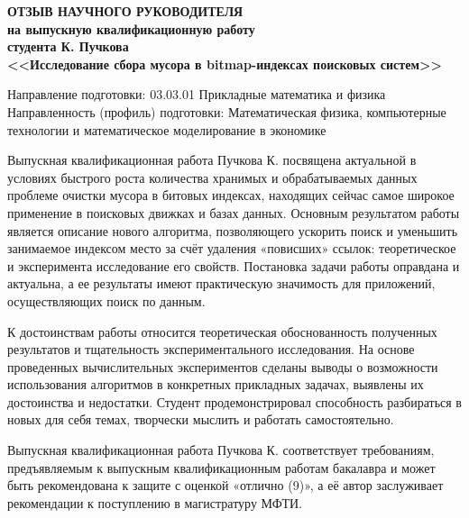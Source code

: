 \documentclass[a4paper,oneside,final,12pt,russian]{extarticle}
\begin{document}
\begin{center}
\textbf{ОТЗЫВ НАУЧНОГО РУКОВОДИТЕЛЯ}\\
\textbf{на выпускную квалификационную работу}\\
\textbf{студента К. Пучкова}\\
\textbf{<<Исследование сбора мусора в bitmap-индексах поисковых систем>>}\\
\end{center}

\onehalfspacing

\begin{flushleft}
Направление подготовки: 03.03.01 Прикладные математика и физика\\
Направленность (профиль) подготовки: Математическая физика,
компьютерные технологии и математическое моделирование в экономике\\
\end{flushleft}

Выпускная квалификационная работа Пучкова К. посвящена актуальной в условиях
быстрого роста количества хранимых и обрабатываемых данных проблеме очистки мусора в
битовых индексах, находящих сейчас самое широкое применение в поисковых движках и базах
данных. Основным результатом работы является описание нового алгоритма, позволяющего
ускорить поиск и уменьшить занимаемое индексом место за счёт удаления «повисших» ссылок:
теоретическое и эксперимента исследование его свойств. Постановка задачи работы
оправдана и актуальна, а ее результаты имеют практическую значимость для приложений,
осуществляющих поиск по данным.

К достоинствам работы относится теоретическая обоснованность полученных результатов
и тщательность экспериментального исследования. На основе проведенных вычислительных
экспериментов сделаны выводы о возможности использования алгоритмов в конкретных
прикладных задачах, выявлены их достоинства и недостатки. Студент продемонстрировал
способность разбираться в новых для себя темах, творчески мыслить и работать самостоятельно.

Выпускная квалификационная работа Пучкова К. соответствует требованиям, предъявляемым
к выпускным квалификационным работам бакалавра и может быть рекомендована к защите
с оценкой «отлично (9)», а её автор заслуживает рекомендации к поступлению в магистратуру МФТИ.

\singlespacing

\vspace{18mm}
\end{document}
